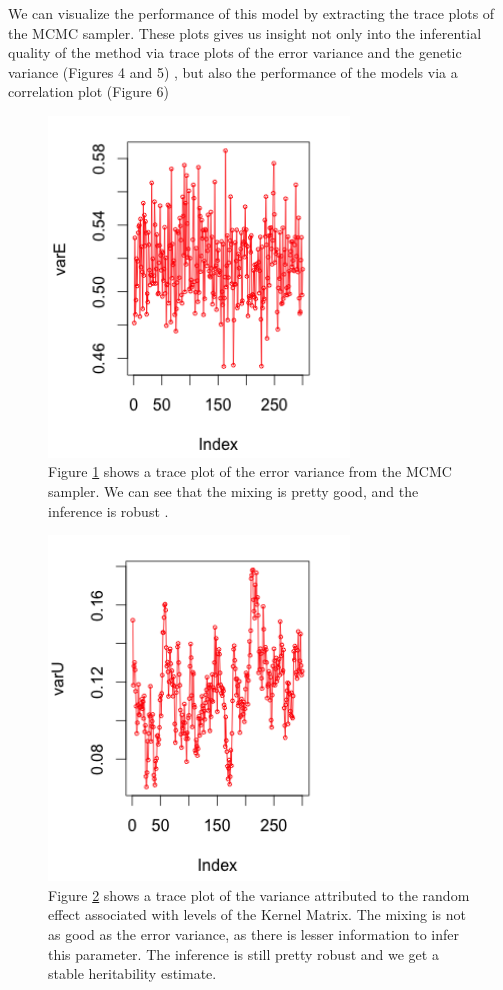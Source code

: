\documentclass{sig-alternate-05-2015}
\begin{document}
We can visualize the performance of this model by extracting the trace plots of the MCMC sampler. These plots gives us insight not only into the
inferential quality of the method via trace plots of the error variance and the genetic variance (Figures 4 and 5) , but also the performance of the models
via a correlation plot (Figure 6)

\begin{figure}
  \includegraphics[width=8cm]{./Images/kernelplot_varE.png}
  \centering
  \caption{Figure \ref{fig:kernelvarE} shows a trace plot of the error variance from the MCMC sampler.
  We can see that the mixing is pretty good, and the inference is robust . }
  \label{fig:kernelvarE}
\end{figure}

\begin{figure}
  \includegraphics[width=8cm]{./Images/kernelplot_varU.png}
  \centering
  \caption{Figure \ref{fig:kernelvarU} shows a trace plot of the variance attributed to the random effect associated with levels of the
  Kernel Matrix. The mixing is not as good as the error variance, as there is lesser information to infer this parameter. The inference is still
  pretty robust and we get a stable heritability estimate.}
  \label{fig:kernelvarU}
\end{figure}
\end{document}
